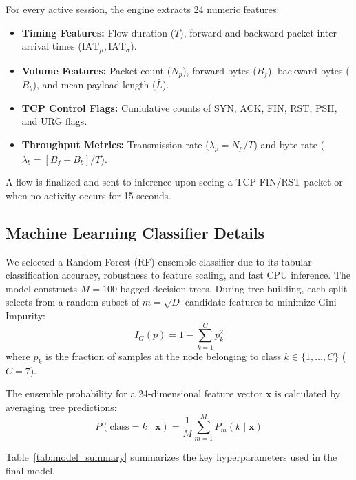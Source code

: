 \documentclass[conference]{IEEEtran}
\begin{document}
For every active session, the engine extracts 24 numeric features:
\begin{itemize}
    \item \textbf{Timing Features:} Flow duration ($T$), forward and backward packet inter-arrival times ($\text{IAT}_{\mu}, \text{IAT}_{\sigma}$).
    \item \textbf{Volume Features:} Packet count ($N_p$), forward bytes ($B_f$), backward bytes ($B_b$), and mean payload length ($\bar{L}$).
    \item \textbf{TCP Control Flags:} Cumulative counts of SYN, ACK, FIN, RST, PSH, and URG flags.
    \item \textbf{Throughput Metrics:} Transmission rate ($\lambda_p = N_p / T$) and byte rate ($\lambda_b = [B_f + B_b] / T$).
\end{itemize}
A flow is finalized and sent to inference upon seeing a TCP FIN/RST packet or when no activity occurs for 15 seconds.

\subsection{Machine Learning Classifier Details}
We selected a Random Forest (RF) ensemble classifier due to its tabular classification accuracy, robustness to feature scaling, and fast CPU inference. The model constructs $M = 100$ bagged decision trees. During tree building, each split selects from a random subset of $m = \sqrt{D}$ candidate features to minimize Gini Impurity:
\begin{equation}
I_G(p) = 1 - \sum_{k=1}^{C} p_k^2
\end{equation}
where $p_k$ is the fraction of samples at the node belonging to class $k \in \{1, \dots, C\}$ ($C = 7$).

The ensemble probability for a 24-dimensional feature vector $\mathbf{x}$ is calculated by averaging tree predictions:
\begin{equation}
P(\text{class} = k \mid \mathbf{x}) = \frac{1}{M} \sum_{m=1}^{M} P_m(k \mid \mathbf{x})
\end{equation}

Table~\ref{tab:model_summary} summarizes the key hyperparameters used in the final model.
\end{document}
